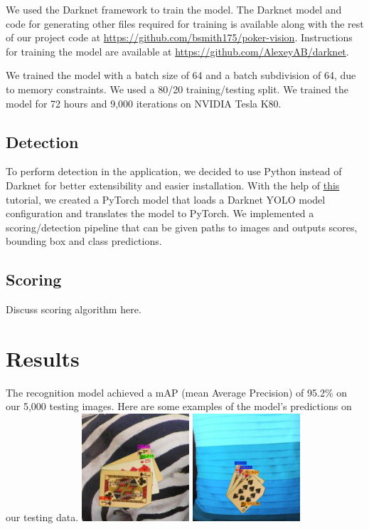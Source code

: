\documentclass[10pt,twocolumn,letterpaper]{article}
\begin{document}
We used the Darknet framework to train the model. The Darknet model and code for generating other files required for training is available along with the rest of our project code at \url{https://github.com/bsmith175/poker-vision}. Instructions for training the model are available at \url{https://github.com/AlexeyAB/darknet}.

We trained the model with a batch size of 64 and a batch subdivision of 64, due to memory constraints. We used a 80/20 training/testing split. We trained the model for 72 hours and 9,000 iterations on NVIDIA Tesla K80. 

\subsection{Detection}

To perform detection in the application, we decided to use Python instead of Darknet for better extensibility and easier installation. With the help of \hyperlink{https://blog.paperspace.com/how-to-implement-a-yolo-object-detector-in-pytorch/}{this} tutorial, we created a PyTorch model that loads a Darknet YOLO model configuration and translates the model to PyTorch. We implemented a scoring/detection pipeline that can be given paths to images and outputs scores, bounding box and class predictions. 

\subsection{Scoring}
Discuss scoring algorithm here.

\section{Results}

The recognition model achieved a mAP (mean Average Precision) of 95.2\% on our 5,000 testing images. 
Here are some examples of the model's predictions on our testing data.
\includegraphics[width=4cm]{predictions (17).jpg}
\includegraphics[width=4cm]{predictions (20).jpg}
\end{document}
